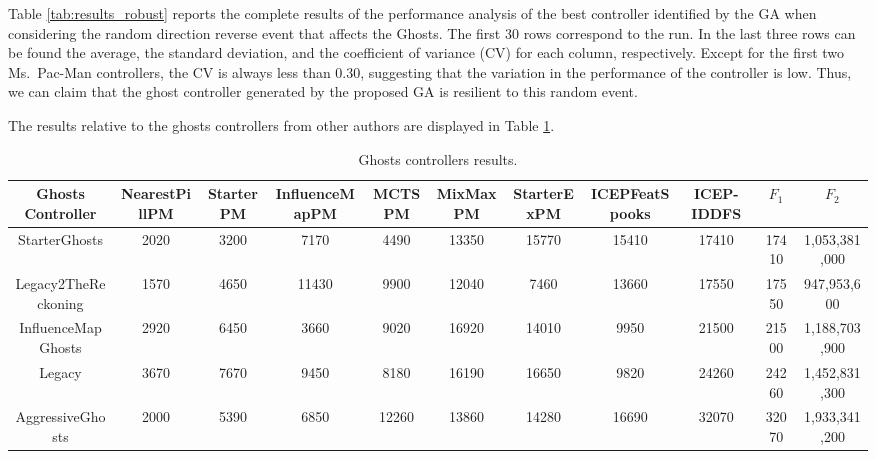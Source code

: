 \documentclass[journal]{IEEEtran}
\begin{document}
Table \ref{tab:results_robust} reports the complete results of the performance analysis of the best controller identified by the GA when considering the random direction reverse event that affects the Ghosts. The first 30 rows correspond to the run. In the last three rows can be found the average, the standard deviation, and the coefficient of variance (CV) for each column, respectively. Except for the first two Ms.\  Pac-Man controllers, the CV is always less than 0.30, suggesting that the variation in the performance of the controller is low. Thus, we can claim that the ghost controller generated by the proposed GA is resilient to this random event.

The results relative to the ghosts controllers from other authors are displayed in Table \ref{tab:results_ghosts}.

\begin{table}
\caption{Ghosts controllers results.}
\label{tab:results_ghosts}
\centering
\footnotesize
\begin{tabular}{|c|cccccccc|cc|}
\hline
Ghosts Controller & NearestPillPM & StarterPM & InfluenceMapPM & MCTSPM & MixMaxPM & StarterExPM & ICEPFeatSpooks & ICEP-IDDFS & $F_1$ & $F_2$	\\
\hline
StarterGhosts	&	2020	&	3200	&	7170	&	4490	&	13350	&	15770	&	15410	&	17410	&	17410	&	1,053,381,000	\\
Legacy2TheReckoning	&	1570	&	4650	&	11430	&	9900	&	12040	&	7460	&	13660	&	17550	&	17550	&	947,953,600	\\
InfluenceMapGhosts	\cite{Svensson2012} &	2920	&	6450	&	3660	&	9020	&	16920	&	14010	&	9950	&	21500	&	21500	&	1,188,703,900	\\
Legacy	&	3670	&	7670	&	9450	&	8180	&	16190	&	16650	&	9820	&	24260	&	24260	&	1,452,831,300	\\
AggressiveGhosts	&	2000	&	5390	&	6850	&	12260	&	13860	&	14280	&	16690	&	32070	&	32070	&	1,933,341,200	\\
\hline
\end{tabular}
\end{table}
\end{document}
